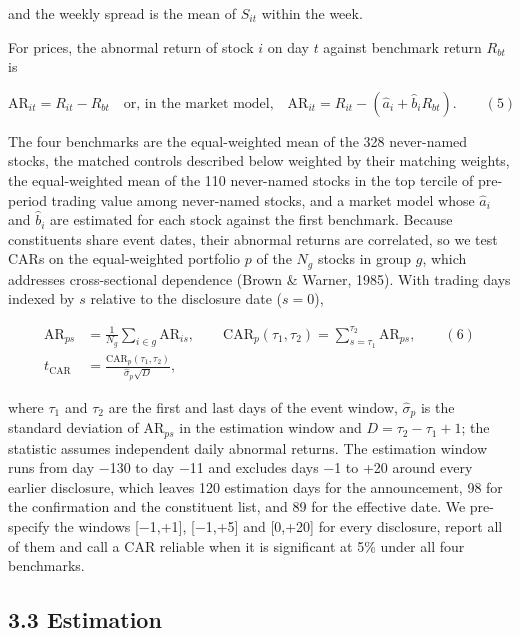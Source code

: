 and the weekly spread is the mean of \(S_{it}\) within the week.

For prices, the abnormal return of stock \(i\) on day \(t\) against
benchmark return \(R_{bt}\) is

\[\mathrm{AR}_{it} = R_{it} - R_{bt} \quad \text{or, in the market model,} \quad \mathrm{AR}_{it} = R_{it} - \left(\hat a_i + \hat b_i R_{bt}\right). \qquad (5)\]

The four benchmarks are the equal-weighted mean of the 328 never-named
stocks, the matched controls described below weighted by their matching
weights, the equal-weighted mean of the 110 never-named stocks in the
top tercile of pre-period trading value among never-named stocks, and a
market model whose \(\hat a_i\) and \(\hat b_i\) are estimated for each
stock against the first benchmark. Because constituents share event
dates, their abnormal returns are correlated, so we test CARs on the
equal-weighted portfolio \(p\) of the \(N_g\) stocks in group \(g\),
which addresses cross-sectional dependence (Brown \& Warner, 1985). With
trading days indexed by \(s\) relative to the disclosure date
(\(s = 0\)),

\[\begin{aligned} \mathrm{AR}_{ps} &= \frac{1}{N_g}\sum_{i \in g}\mathrm{AR}_{is}, \qquad \mathrm{CAR}_p(\tau_1, \tau_2) = \sum_{s=\tau_1}^{\tau_2}\mathrm{AR}_{ps}, \qquad (6) \\ t_{\mathrm{CAR}} &= \frac{\mathrm{CAR}_p(\tau_1, \tau_2)}{\hat\sigma_p\sqrt{D}}, \end{aligned}\]

where \(\tau_1\) and \(\tau_2\) are the first and last days of the event
window, \(\hat\sigma_p\) is the standard deviation of
\(\mathrm{AR}_{ps}\) in the estimation window and
\(D = \tau_2 - \tau_1 + 1\); the statistic assumes independent daily
abnormal returns. The estimation window runs from day −130 to day −11
and excludes days −1 to +20 around every earlier disclosure, which
leaves 120 estimation days for the announcement, 98 for the confirmation
and the constituent list, and 89 for the effective date. We pre-specify
the windows {[}−1,+1{]}, {[}−1,+5{]} and {[}0,+20{]} for every
disclosure, report all of them and call a CAR reliable when it is
significant at 5\% under all four benchmarks.

\hypertarget{estimation}{%
\subsection{3.3 Estimation}\label{estimation}}

